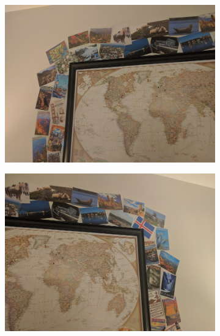 \documentclass[12pt]{article}
\begin{document}
\begin{figure}[t!]
    \begin{subfigure}[t]{0.3\textwidth}
        \centering
        \includegraphics[width=\linewidth]{../Images/CustomSet1/1}
    \end{subfigure}
    \begin{subfigure}[t]{0.3\textwidth}
        \centering
        \includegraphics[width=\linewidth]{../Images/CustomSet1/2}
    \end{subfigure}
        \begin{subfigure}[t]{0.3\textwidth}
        \centering

\end{subfigure}
\end{figure}
\end{document}
